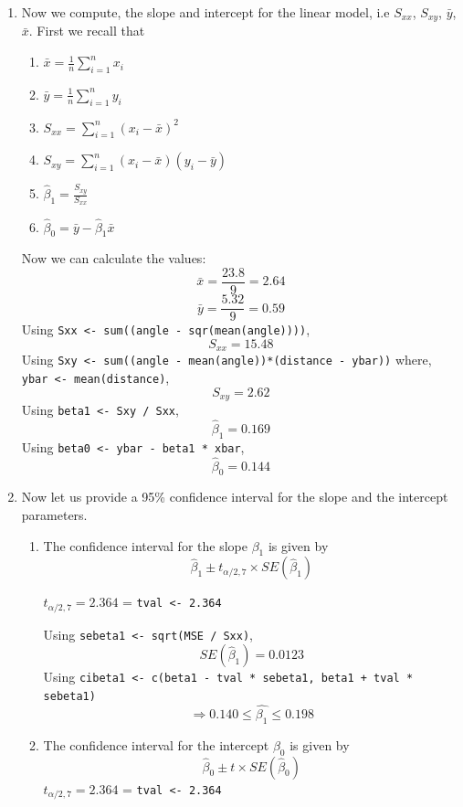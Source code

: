 \documentclass[12pt]{article}
\begin{document}
\begin{enumerate}[1.]
\begin{enumerate}
            \item Now we compute, the slope and intercept for the linear model, i.e $S_{xx}$, $S_{xy}$, 
            $\bar{y}$, $\bar{x}$.
            First we recall that
            \begin{enumerate}
                \item $\bar{x} = \frac{1}{n} \sum_{i=1}^{n} x_i$
                \item $\bar{y} = \frac{1}{n} \sum_{i=1}^{n} y_i$
                \item $S_{xx} = \sum_{i=1}^{n} (x_i - \bar{x})^2$
                \item $S_{xy} = \sum_{i=1}^{n} (x_i - \bar{x})(y_i - \bar{y})$
                \item $\hat{\beta}_1 = \frac{S_{xy}}{S_{xx}}$
                \item $\hat{\beta}_0 = \bar{y} - \hat{\beta}_1 \bar{x}$
            \end{enumerate}
            Now we can calculate the values:
            \[ \bar{x} = \frac{23.8}{9} = 2.64 \]
            \[\bar{y} = \frac{5.32}{9} = 0.59 \]
            Using \texttt{Sxx <- sum((angle - sqr(mean(angle))))},
            \[ S_{xx} =  15.48 \]
            Using \texttt{Sxy <- sum((angle - mean(angle))*(distance - ybar))} where,
            \texttt{ybar <- mean(distance)},
            \[ S_{xy} = 2.62 \]
            Using \texttt{beta1 <- Sxy / Sxx},
            \[ \hat{\beta}_1 = 0.169 \]
            Using \texttt{beta0 <- ybar - beta1 * xbar},
            \[ \hat{\beta}_0 = 0.144 \]

            \item Now let us provide a 95\% confidence interval for the slope and the intercept parameters.
            \begin{enumerate}
                \item The confidence interval for the slope $\beta_1$ is given by
                \[ \hat{\beta}_1 \pm t_{\alpha / 2, 7} \times SE(\hat{\beta}_1) \]

                $ t_{\alpha / 2, 7} = 2.364$  = \texttt{tval <- 2.364}

                Using \texttt{sebeta1 <- sqrt(MSE / Sxx)},
                \[ SE(\hat{\beta}_1) = 0.0123 \]
                Using \texttt{cibeta1 <- c(beta1 - tval * sebeta1, beta1 + tval * sebeta1)}
                \[ \Rightarrow 0.140 \leq \hat{\beta_1} \leq 0.198 \]
                \item The confidence interval for the intercept $\beta_0$ is given by
                \[ \hat{\beta}_0 \pm t \times SE(\hat{\beta}_0) \]
                $ t_{\alpha / 2, 7} = 2.364$  = \texttt{tval <- 2.364}


\end{enumerate}
\end{enumerate}
\end{enumerate}
\end{document}
